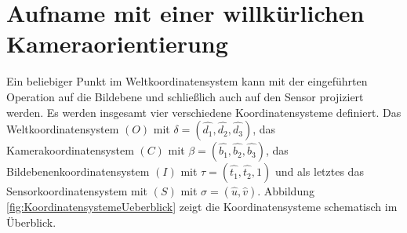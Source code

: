 
\pagebreak


\section{Aufname mit einer willkürlichen Kameraorientierung}

Ein beliebiger Punkt im Weltkoordinatensystem kann mit der eingeführten Operation auf die Bildebene und schließlich auch auf den Sensor projiziert werden. Es werden insgesamt vier verschiedene Koordinatensysteme definiert.
Das Weltkoordinatensystem $(O)$ mit $\delta =(\hat{d_1}, \hat{d_2},\hat{d_3})$, das Kamerakoordinatensystem $(C)$ mit $\beta = (\hat{b_1},\hat{b_2},\hat{b_3})$, das Bildebenenkoordinatensystem $(I)$ mit $\tau = (\hat{t_1},\hat{t_2},1)$ und als letztes das Sensorkoordinatensystem mit $(S)$ mit $\sigma = (\hat{u},\hat{v})$. Abbildung \ref{fig:KoordinatensystemeUeberblick} zeigt die Koordinatensysteme schematisch im Überblick. 


